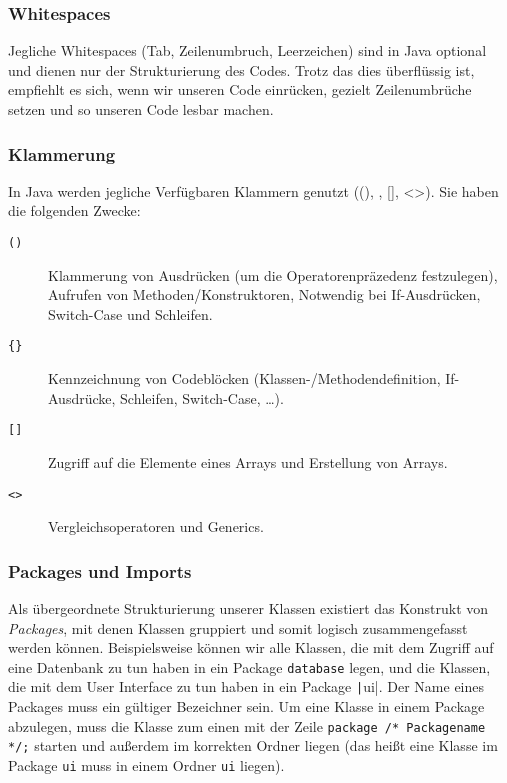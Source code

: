 	\subsubsection{Whitespaces}
		Jegliche Whitespaces (Tab, Zeilenumbruch, Leerzeichen) sind in Java optional und dienen nur der Strukturierung des Codes. Trotz das dies überflüssig ist, empfiehlt es sich, wenn wir unseren Code einrücken, gezielt Zeilenumbrüche setzen und so unseren Code lesbar machen.
	
	\subsubsection{Klammerung}
		In Java werden jegliche Verfügbaren Klammern genutzt ((), {}, [], <>). Sie haben die folgenden Zwecke:
		\begin{description}
			\item[\texttt{()}] Klammerung von Ausdrücken (um die Operatorenpräzedenz festzulegen), Aufrufen von Methoden/Konstruktoren, Notwendig bei If-Ausdrücken, Switch-Case und Schleifen.
			\item[\texttt{\{\}}] Kennzeichnung von Codeblöcken (Klassen-/Methodendefinition, If-Ausdrücke, Schleifen, Switch-Case, \dots).
			\item[\texttt{[]}] Zugriff auf die Elemente eines Arrays und Erstellung von Arrays.
			\item[\texttt{<>}] Vergleichsoperatoren und Generics.
		\end{description}
	
	\subsubsection{Packages und Imports}
		Als übergeordnete Strukturierung unserer Klassen existiert das Konstrukt von \textit{Packages}, mit denen Klassen gruppiert und somit logisch zusammengefasst werden können. Beispielsweise können wir alle Klassen, die mit dem Zugriff auf eine Datenbank zu tun haben in ein Package \texttt{database} legen, und die Klassen, die mit dem User Interface zu tun haben in ein Package \texttt|ui|. Der Name eines Packages muss ein gültiger Bezeichner sein. Um eine Klasse in einem Package abzulegen, muss die Klasse zum einen mit der Zeile \lstinline|package /* Packagename */;| starten und außerdem im korrekten Ordner liegen (das heißt eine Klasse im Package \texttt{ui} muss in einem Ordner \texttt{ui} liegen).
		

